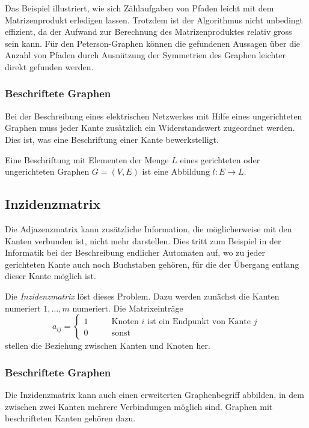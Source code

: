 Das Beispiel illustriert, wie sich Zählaufgaben von Pfaden leicht mit dem
Matrizenprodukt erledigen lassen.
Trotzdem ist der Algorithmus nicht unbedingt effizient, da der Aufwand
zur Berechnung des Matrizenproduktes relativ gross sein kann.
Für den Peterson-Graphen können die gefundenen Aussagen über die Anzahl
von Pfaden durch Ausnützung der Symmetrien des Graphen leichter direkt
gefunden werden.

\subsubsection{Beschriftete Graphen}
Bei der Beschreibung eines elektrischen Netzwerkes mit Hilfe eines
ungerichteten Graphen muss jeder Kante zusätzlich ein Widerstandswert
zugeordnet werden.
Dies ist, was eine Beschriftung einer Kante bewerkstelligt.

\begin{definition}
Eine Beschriftung mit Elementen der Menge $L$
eines gerichteten oder ungerichteten Graphen $G=(V,E)$ 
ist eine Abbildung $l\colon E\to L$.
%
\end{definition}

\subsection{Inzidenzmatrix}
Die Adjazenzmatrix kann zusätzliche Information, die möglicherweise
mit den Kanten verbunden ist, nicht mehr darstellen.
Dies tritt zum Beispiel in der Informatik bei der Beschreibung
endlicher Automaten auf, wo zu jeder gerichteten Kante auch noch
Buchstaben gehören, für die der Übergang entlang dieser Kante
möglich ist.

Die {\em Inzidenzmatrix} löst dieses Problem.
%
Dazu werden zunächst die Kanten numeriert $1,\dots,m$
numeriert.
Die Matrixeinträge
\[
a_{ij} = \begin{cases}
1\qquad&\text{Knoten $i$ ist ein Endpunkt von Kante $j$}
\\
0\qquad&\text{sonst}
\end{cases}
\]
stellen die Beziehung zwischen Kanten und Knoten her.

\subsubsection{Beschriftete Graphen}
Die Inzidenzmatrix kann auch einen erweiterten Graphenbegriff abbilden,
in dem zwischen zwei Kanten mehrere Verbindungen möglich sind.
Graphen mit beschrifteten Kanten gehören dazu.

